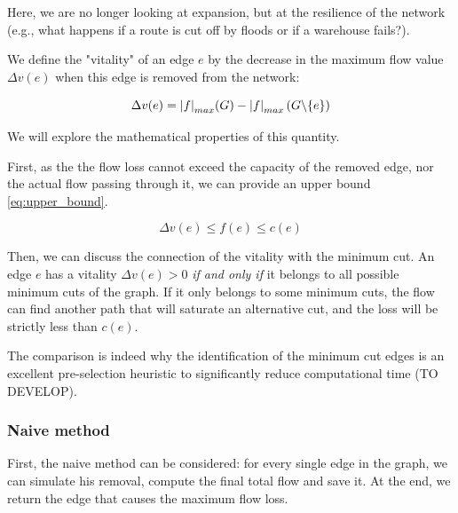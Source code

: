 \documentclass[12pt, openany]{article}
\begin{document}
Here, we are no longer looking at expansion, but at the resilience of the network (e.g., what happens if a route is cut off by floods or if a warehouse fails?).

We define the "vitality" of an edge $e$ by the decrease in the maximum flow value $\Delta v(e)$ when this edge is removed from the network:

\begin{equation}
    \Delta v(e) = \abs{f}_{max}(G) - \abs{f}_{max}\left(G \backslash\{e\}\right)
\end{equation}

We will explore the mathematical properties of this quantity.

First, as the the flow loss cannot exceed the capacity of the removed edge, nor the actual flow passing through it, we can provide an upper bound \eqref{eq:upper_bound}.

\begin{equation}\label{eq:upper_bound}
    \Delta v(e) \leq f(e) \leq c(e)
\end{equation}

Then, we can discuss the connection of the vitality with the minimum cut. An edge $e$ has a vitality $\Delta v(e) > 0$ \textit{if and only if} it belongs to all possible minimum cuts of the graph. If it only belongs to some minimum cuts, the flow can find another path that will saturate an alternative cut, and the loss will be strictly less than $c(e)$.

The comparison is indeed why the identification of the minimum cut edges is an excellent pre-selection heuristic to significantly reduce computational time (TO DEVELOP).

\subsubsection{Naive method}\label{sec:2_naive_method}

First, the naive method can be considered: for every single edge in the graph, we can simulate his removal, compute the final total flow and save it. At the end, we return the edge that causes the maximum flow loss.
\end{document}
